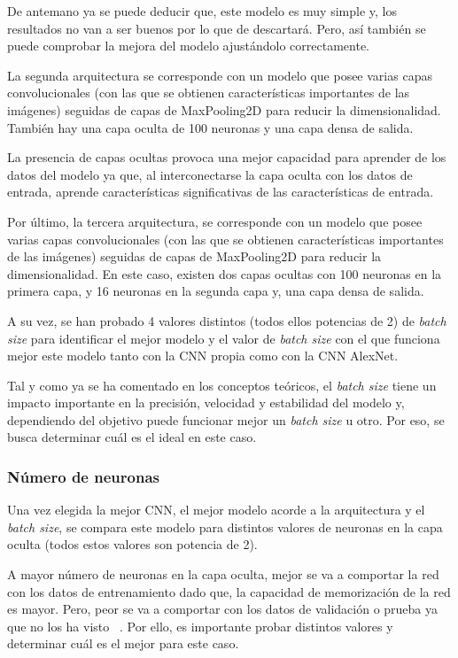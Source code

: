 De antemano ya se puede deducir que, este modelo es muy simple y, los resultados no van a ser buenos por lo que de descartará. Pero, así también se puede comprobar la mejora del modelo ajustándolo correctamente.

La segunda arquitectura se corresponde con un modelo que posee varias capas convolucionales (con las que se obtienen características importantes de las imágenes) seguidas de capas de MaxPooling2D para reducir la dimensionalidad. También hay una capa oculta de 100 neuronas y una capa densa de salida. 

La presencia de capas ocultas provoca una mejor capacidad para aprender de los datos del modelo ya que, al interconectarse la capa oculta con los datos de entrada, aprende características significativas de las características de entrada.

Por último, la tercera arquitectura, se corresponde con un modelo que posee varias capas convolucionales (con las que se obtienen características importantes de las imágenes) seguidas de capas de MaxPooling2D para reducir la dimensionalidad. En este caso, existen dos capas ocultas con 100 neuronas en la primera capa, y 16 neuronas en la segunda capa y, una capa densa de salida.

A su vez, se han probado 4 valores distintos (todos ellos potencias de 2) de \textit{batch size} para identificar el mejor modelo y el valor de \textit{batch size} con el que funciona mejor este modelo tanto con la CNN propia como con la CNN AlexNet.

Tal y como ya se ha comentado en los conceptos teóricos, el \textit{batch size} tiene un impacto importante en la precisión, velocidad y estabilidad del modelo y, dependiendo del objetivo puede funcionar mejor un \textit{batch size} u otro. Por eso, se busca determinar cuál es el ideal en este caso.

\subsubsection{Número de neuronas}
Una vez elegida la mejor CNN, el mejor modelo acorde a la arquitectura y el \textit{batch size}, se compara este modelo para distintos valores de neuronas en la capa oculta (todos estos valores son potencia de 2).

A mayor número de neuronas en la capa oculta, mejor se va a comportar la red con los datos de entrenamiento dado que, la capacidad de memorización de la red es mayor. Pero, peor se va a comportar con los datos de validación o prueba ya que no los ha visto ~\cite{diego23}. Por ello, es importante probar distintos valores y determinar cuál es el mejor para este caso.






